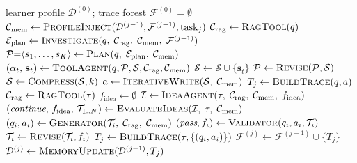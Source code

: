 \begin{algorithm}[ht!]
\caption{Closed-Loop Personalized Tutoring}\label{alg:loop}
\small
\begin{algorithmic}[1]
\Require learner profile $\mathcal{D}^{(0)}$;\; trace forest $\mathcal{F}^{(0)} = \emptyset$
    \State $\mathcal{C}_{\text{mem}} \gets \Call{ProfileInject}{\mathcal{D}^{(j{-}1)}, \mathcal{F}^{(j{-}1)}, \text{task}_j}$
        \State $\mathcal{C}_{\text{rag}} \gets \textsc{RagTool}(q)$
        \State $\mathcal{E}_{\text{plan}} \gets \Call{Investigate}{q,\;\mathcal{C}_{\text{rag}},\;\mathcal{C}_{\text{mem}},\;\mathcal{F}^{(j{-}1)}}$ 
        \State $\mathcal{P}{=}\langle s_1,\dots,s_K\rangle \gets \Call{Plan}{q,\;\mathcal{E}_{\text{plan}},\;\mathcal{C}_{\text{mem}}}$
         
                \State $(\alpha_t,\, \mathbf{s}_t) \gets \Call{ToolAgent}{q, \mathcal{P}, \mathcal{S}, \mathcal{C}_{\text{rag}}, \mathcal{C}_{\text{mem}}}$
                \State $\mathcal{S} \gets \mathcal{S} \cup \{\mathbf{s}_t\}$
                    \State $\mathcal{P} \gets \Call{Revise}{\mathcal{P}, \mathcal{S}}$
                \EndIf
            \EndWhile
            \State $\mathcal{S} \gets \Call{Compress}{\mathcal{S}, k}$
        \EndFor
        \State $a \gets \Call{IterativeWrite}{\mathcal{S},\;\mathcal{C}_{\text{mem}}}$ 
        \State $T_j \gets \Call{BuildTrace}{q, a}$
    \Else {}
      \State $\mathcal{C}_{\text{rag}} \gets \textsc{RagTool}(\tau)$
        \State $f_{\text{idea}} \gets \emptyset$
        \Repeat
            \State $\mathcal{I} \gets \Call{IdeaAgent}{\tau,\;\mathcal{C}_{\text{rag}},\;\mathcal{C}_{\text{mem}},\;f_{\text{idea}}}$ 
            \State $(\textit{continue},\, f_{\text{idea}},\, \mathcal{T}_{1..N}) \gets \Call{EvaluateIdeas}{\mathcal{I},\;\tau,\;\mathcal{C}_{\text{mem}}}$
         
            \Repeat
                \State $(q_i, a_i) \gets \Call{Generator}{\mathcal{T}_i,\;\mathcal{C}_{\text{rag}},\;\mathcal{C}_{\text{mem}}}$
                \State $(\textit{pass}, f_i) \gets \Call{Validator}{q_i, a_i, \mathcal{T}_i}$
                 $\mathcal{T}_i \gets \Call{Revise}{\mathcal{T}_i, f_i}$
                \EndIf
        \EndFor
        \State $T_j \gets \Call{BuildTrace}{\tau, \{(q_i, a_i)\}}$
    \EndIf
    \State $\mathcal{F}^{(j)} \gets \mathcal{F}^{(j{-}1)} \cup \{T_j\}$
    \State $\mathcal{D}^{(j)} \gets \Call{MemoryUpdate}{\mathcal{D}^{(j{-}1)}, T_j}$
\EndFor
\end{algorithmic}
\end{algorithm}

